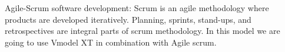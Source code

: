 \label{sec:process-model}
Agile-Scrum software development:  Scrum is an agile methodology where products are developed iteratively. Planning, sprints, stand-ups, and retrospectives are integral parts of scrum methodology. In this model we are going to use Vmodel XT in combination with Agile scrum.